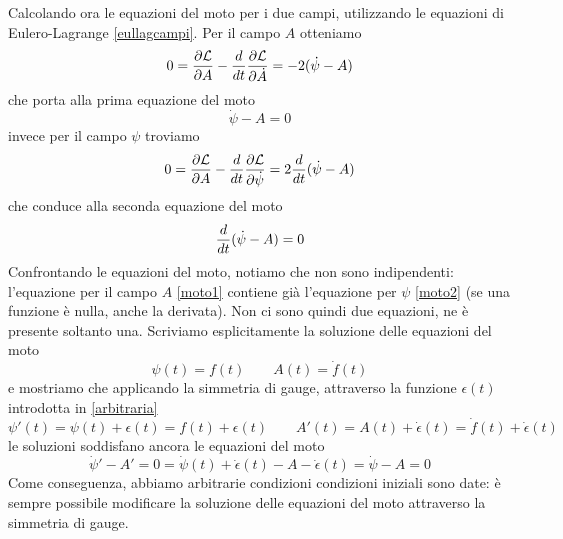     Calcolando ora le equazioni del moto per i due campi, utilizzando le equazioni di Eulero-Lagrange \eqref{eullagcampi}. Per il campo $A$ otteniamo 
    \begin{equation*}
        0 = \frac{\partial\mathcal L}{\partial A} - \frac{d}{dt} \frac{\partial\mathcal L}{\partial\dot A} = - 2 (\dot \psi - A)
    \end{equation*}
    che porta alla prima equazione del moto 
    \begin{equation} \label{moto1}
        \dot \psi - A = 0
    \end{equation}
    invece per il campo $\psi$ troviamo
    \begin{equation*}
        0 = \frac{\partial\mathcal L}{\partial A} - \frac{d}{dt} \frac{\partial\mathcal L}{\partial\dot \psi} = 2 \frac{d}{dt} (\dot \psi - A)
    \end{equation*}
    che conduce alla seconda equazione del moto 
    \begin{equation} \label{moto2}
        \frac{d}{dt} (\dot \psi - A) = 0
    \end{equation}
    Confrontando le equazioni del moto, notiamo che non sono indipendenti: l'equazione per il campo $A$ \eqref{moto1} contiene già l'equazione per $\psi$ \eqref{moto2} (se una funzione è nulla, anche la derivata). Non ci sono quindi due equazioni, ne è presente soltanto una. Scriviamo esplicitamente la soluzione delle equazioni del moto 
\begin{equation*}
    \psi(t) = f(t) \qquad A(t) = \dot f(t)
\end{equation*}
    e mostriamo che applicando la simmetria di gauge, attraverso la funzione $\epsilon(t)$ introdotta in \eqref{arbitraria}
\begin{equation*}
    \psi'(t) = \psi(t) + \epsilon(t) = f(t) + \epsilon(t) \qquad A'(t) = A(t) + \dot \epsilon(t) = \dot f(t) + \dot \epsilon(t)
\end{equation*}
    le soluzioni soddisfano ancora le equazioni del moto 
\begin{equation*}
    \dot \psi' - A' = 0 = \dot \psi(t) + \dot \epsilon(t) - A - \dot \epsilon(t) = \dot \psi - A = 0
\end{equation*}
    Come conseguenza, abbiamo arbitrarie condizioni condizioni iniziali sono date: è sempre possibile modificare la soluzione delle equazioni del moto attraverso la simmetria di gauge. 

